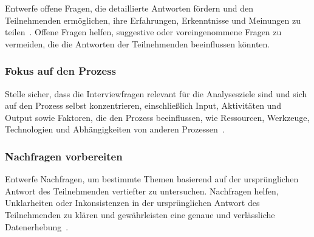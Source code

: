Entwerfe offene Fragen, die detaillierte Antworten fördern und den Teilnehmenden ermöglichen, ihre Erfahrungen, Erkenntnisse und Meinungen zu teilen~\cite{Kvale2009}. 
Offene Fragen helfen, suggestive oder voreingenommene Fragen zu vermeiden, die die Antworten der Teilnehmenden beeinflussen könnten.

\subsubsection{Fokus auf den Prozess}

Stelle sicher, dass die Interviewfragen relevant für die Analysesziele sind und sich auf den Prozess selbst konzentrieren, einschließlich Input, Aktivitäten und Output sowie Faktoren, die den Prozess beeinflussen, wie Ressourcen, Werkzeuge, Technologien und Abhängigkeiten von anderen Prozessen~\cite{Dumas2013}.

\subsubsection{Nachfragen vorbereiten}

Entwerfe Nachfragen, um bestimmte Themen basierend auf der ursprünglichen Antwort des Teilnehmenden vertiefter zu untersuchen. Nachfragen helfen, Unklarheiten oder Inkonsistenzen in der ursprünglichen Antwort des Teilnehmenden zu klären und gewährleisten eine genaue und verlässliche Datenerhebung~\cite{Kvale2009}.
